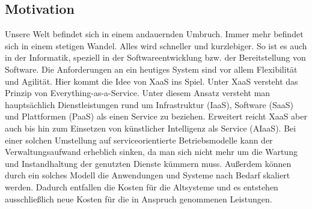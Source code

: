 \subsection{Motivation}
Unsere Welt befindet sich in einem andauernden Umbruch. Immer mehr befindet sich in einem stetigen Wandel. Alles wird schneller und kurzlebiger. So ist es auch in der Informatik, speziell in der Softwareentwicklung bzw. der Bereitstellung von Software. Die Anforderungen an ein heutiges System sind vor allem Flexibilität und Agilität. Hier kommt die Idee von XaaS ins Spiel. Unter XaaS versteht das Prinzip von Everything-as-a-Service. Unter diesem Ansatz versteht man hauptsächlich Dienstleistungen rund um Infrastruktur (IaaS), Software (SaaS) und Plattformen (PaaS) als einen Service zu beziehen. Erweitert reicht XaaS aber auch bis hin zum Einsetzen von künstlicher Intelligenz als Service (AIaaS). Bei einer solchen Umstellung auf serviceorientierte Betriebsmodelle kann der Verwaltungsaufwand erheblich sinken, da man sich nicht mehr um die Wartung und Instandhaltung der genutzten Dienste kümmern muss. Außerdem können durch ein solches Modell die Anwendungen und Systeme nach Bedarf skaliert werden. Dadurch entfallen die Kosten für die Altsysteme und es entstehen ausschließlich neue Kosten für die in Anspruch genommenen Leistungen. \\
